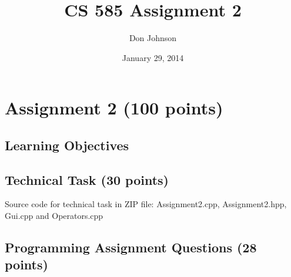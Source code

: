 \documentclass{article}
\title{CS 585 Assignment 2}
\author{Don Johnson}
\date{January 29, 2014}
\begin{document}
\maketitle
\section{Assignment 2 (100 points)}
\subsection{Learning Objectives}
\subsection{Technical Task (30 points)}
Source code for technical task in ZIP file: Assignment2.cpp, Assignment2.hpp, Gui.cpp and Operators.cpp
\subsection{Programming Assignment Questions (28 points)}
\end{document}
